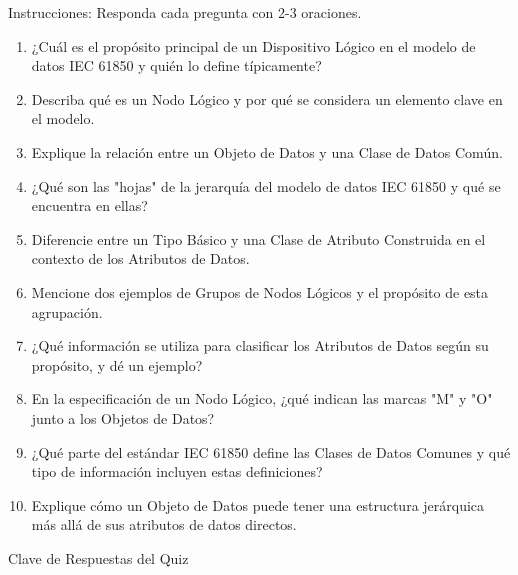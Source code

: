 \documentclass[a5paper]{book}%
\begin{document}
Instrucciones: Responda cada pregunta con 2-3 oraciones.

\begin{enumerate}
\item ¿Cuál es el propósito principal de un Dispositivo Lógico en el modelo de datos IEC 61850 y quién lo define típicamente?
\item Describa qué es un Nodo Lógico y por qué se considera un elemento clave en el modelo.
\item Explique la relación entre un Objeto de Datos y una Clase de Datos Común.
\item ¿Qué son las "hojas" de la jerarquía del modelo de datos IEC 61850 y qué se encuentra en ellas?
\item Diferencie entre un Tipo Básico y una Clase de Atributo Construida en el contexto de los Atributos de Datos.
\item Mencione dos ejemplos de Grupos de Nodos Lógicos y el propósito de esta agrupación.
\item ¿Qué información se utiliza para clasificar los Atributos de Datos según su propósito, y dé un ejemplo?
\item En la especificación de un Nodo Lógico, ¿qué indican las marcas "M" y "O" junto a los Objetos de Datos?
\item ¿Qué parte del estándar IEC 61850 define las Clases de Datos Comunes y qué tipo de información incluyen estas definiciones?
\item Explique cómo un Objeto de Datos puede tener una estructura jerárquica más allá de sus atributos de datos directos.
  \end{enumerate}

Clave de Respuestas del Quiz
\end{document}
